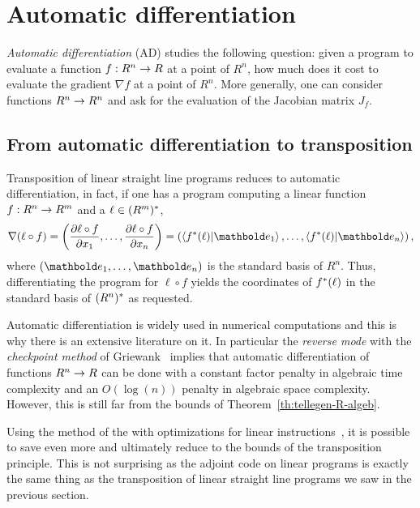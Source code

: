 

\section{Automatic differentiation}
\label{sec:autom-diff}

\emph{Automatic differentiation}
(AD) studies the following
question: given a program to evaluate a function $f:R^n\rightarrow R$ at a
point of $R^n$, how much does it cost to evaluate the gradient $\nabla
f$ at a point of $R^n$. More generally, one can consider functions
$R^n\rightarrow R^n$ and ask for the evaluation of the Jacobian matrix $J_f$.

\subsection{From automatic differentiation to transposition}
\label{sec:from-autom-diff}
Transposition of linear straight line programs reduces to automatic
differentiation, in fact, if one has a program computing a linear
function $f:R^n\rightarrow R^m$ and a $\ell\in(R^m)^\ast$,
\begin{equation}
  \label{eq:261}
  \nabla (\ell\circ f) =
  \left(\frac{\partial \ell\circ f}{\partial x_1},\ldots,\frac{\partial \ell\circ f}{\partial x_n}\right) =
  \left(\braket{\dual{f}(\ell)}{\basis{e}_1},\ldots,\braket{\dual{f}(\ell)}{\basis{e}_n}\right)
  \text{,}
\end{equation}
where $(\basis{e}_1,\ldots,\basis{e}_n)$ is the standard basis of
$R^n$. Thus, differentiating the program for $\ell\circ f$ yields the
coordinates of $f^\ast(\ell)$ in the standard basis of
$(R^n)^\ast$ as requested.

Automatic differentiation is widely used in numerical computations and
this is why there is an extensive literature on it. In particular the
\emph{reverse
  mode} with the
\emph{checkpoint
  method} of Griewank~\cite{griewank92} implies that automatic
differentiation of functions $R^n\rightarrow R$ can be done with a constant
factor penalty in algebraic time complexity and an $O(\log(n))$
penalty in algebraic space complexity. However, this is still far from
the bounds of Theorem~\ref{th:tellegen-R-algeb}.

Using the method of the
 with optimizations for linear
instructions~\cite{gilbert+levey+masse91}, it is possible to save even
more and ultimately reduce to the bounds of the transposition
principle. This is not surprising as the adjoint code on linear
programs is exactly the same thing as the transposition of linear
straight line programs we saw in the previous section.

